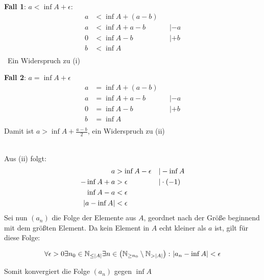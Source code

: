 \documentclass{article}
\begin{document}
\begin{minipage}[t]{.45\textwidth}
  \textbf{Fall 1}: $a < \inf A + \epsilon$:
  \begin{align*}
    a &< \inf A + (a - b) \\
    a &< \inf A + a - b && | -a \\
    0 &< \inf A - b     && | +b \\
    b &< \inf A \\
  \end{align*}\
  Ein Widerspruch zu (i)
\end{minipage}
\begin{minipage}[t]{.45\textwidth}
  \textbf{Fall 2}: $a = \inf A + \epsilon$
  \begin{align*}
    a &= \inf A + (a - b) \\
    a &= \inf A + a - b && | -a \\
    0 &= \inf A - b     && | +b \\
    b &= \inf A \\
  \end{align*}
  Damit ist $a > \inf A + \frac{a - b}{2}$, ein Widerspruch zu (ii)
\end{minipage}
\\
Aus (ii) folgt:
\begin{align*}
  a &> \inf A - \epsilon && | - \inf A \\
  -\inf A + a &> \epsilon && | \cdot (-1) \\
  \inf A - a &< \epsilon \\
  \abs{a - \inf A} &< \epsilon \\ 
\end{align*}
Sei nun $(a_n)$ die Folge der Elemente aus $A$, geordnet nach der Größe beginnend mit dem größten Element.
Da kein Element in $A$ echt kleiner als $a$ ist, gilt für diese Folge:

\[
  \forall \epsilon > 0 \exists n_0 \in \mathbb{N}_{\leq \abs{A}} \exists n \in \left(\mathbb{N}_{\geq n_0} \setminus \mathbb{N}_{> \abs{A}}\right) \colon \abs{a_n - \inf A} < \epsilon
\]

Somit konvergiert die Folge $(a_n)$ gegen $\inf A$
\end{document}
